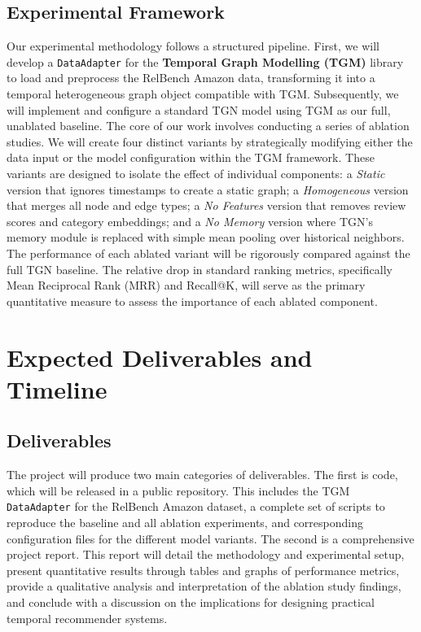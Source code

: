 \documentclass[sigconf]{acmart}
\begin{document}
\subsection{Experimental Framework}
Our experimental methodology follows a structured pipeline. First, we will develop a \texttt{DataAdapter} for the \textbf{Temporal Graph Modelling (TGM)} library~\cite{chmura2025tgm} to load and preprocess the RelBench Amazon data, transforming it into a temporal heterogeneous graph object compatible with TGM. Subsequently, we will implement and configure a standard TGN model using TGM as our full, unablated baseline. The core of our work involves conducting a series of ablation studies. We will create four distinct variants by strategically modifying either the data input or the model configuration within the TGM framework. These variants are designed to isolate the effect of individual components: a \textit{Static} version that ignores timestamps to create a static graph; a \textit{Homogeneous} version that merges all node and edge types; a \textit{No Features} version that removes review scores and category embeddings; and a \textit{No Memory} version where TGN's memory module is replaced with simple mean pooling over historical neighbors. The performance of each ablated variant will be rigorously compared against the full TGN baseline. The relative drop in standard ranking metrics, specifically Mean Reciprocal Rank (MRR) and Recall@K, will serve as the primary quantitative measure to assess the importance of each ablated component.

\section{Expected Deliverables and Timeline}
\subsection{Deliverables}
The project will produce two main categories of deliverables. The first is code, which will be released in a public repository. This includes the TGM \texttt{DataAdapter} for the RelBench Amazon dataset, a complete set of scripts to reproduce the baseline and all ablation experiments, and corresponding configuration files for the different model variants. The second is a comprehensive project report. This report will detail the methodology and experimental setup, present quantitative results through tables and graphs of performance metrics, provide a qualitative analysis and interpretation of the ablation study findings, and conclude with a discussion on the implications for designing practical temporal recommender systems.
\end{document}
